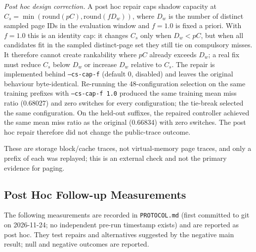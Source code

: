 \documentclass[10pt,twocolumn,a4paper]{IEEEtran}
\begin{document}
\emph{Post hoc design correction.} A post hoc repair caps shadow capacity at
$C_s=\min(\mathrm{round}(pC),\mathrm{round}(f D_w))$, where $D_w$ is the
number of distinct sampled page IDs in the evaluation window and $f=1.0$ is
fixed a priori. With $f=1.0$ this is an identity cap: it changes $C_s$ only
when $D_w < pC$, but when all candidates fit in the sampled distinct-page
set they still tie on compulsory misses. It therefore cannot create
rankability where $pC$ already exceeds $D_w$; a real fix must reduce $C_s$
below $D_w$ or increase $D_w$ relative to $C_s$. The repair is implemented
behind \texttt{--cs-cap-f} (default 0, disabled) and leaves the original
behaviour byte-identical. Re-running the 48-configuration selection on the
same training prefixes with \texttt{--cs-cap-f 1.0} produced the same training
mean miss ratio (0.68027) and zero switches for every configuration; the
tie-break selected the same configuration. On the held-out suffixes, the
repaired controller achieved the same mean miss ratio as the original
(0.66834) with zero switches. The post hoc repair therefore did not change
the public-trace outcome.

These are storage block/cache traces, not virtual-memory page traces, and only
a prefix of each was replayed; this is an external check and not the primary
evidence for paging.

\subsection{Post Hoc Follow-up Measurements}
\label{sec:posthoc_followups}

The following measurements are recorded in \texttt{PROTOCOL.md}
(first committed to git on 2026-11-24; no independent pre-run timestamp
exists) and are reported as post hoc. They test repairs and
alternatives suggested by the negative main result; null and negative
outcomes are reported.
\end{document}

